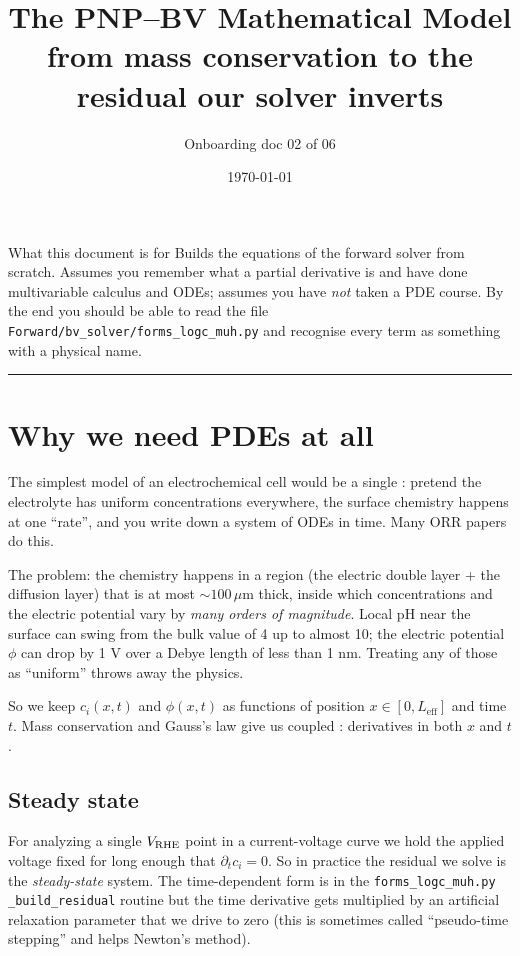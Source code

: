 \documentclass[11pt]{article}
\title{\bfseries The PNP--BV Mathematical Model \\
       \large from mass conservation to the residual our solver inverts}
\author{Onboarding doc 02 of 06}
\date{\today}
\begin{document}
\maketitle

\begin{callout}{What this document is for}
Builds the equations of the forward solver from scratch.
Assumes you remember what a partial derivative is and have done
multivariable calculus and ODEs; assumes you have \emph{not} taken a
PDE course. By the end you should be able to read the file
\texttt{Forward/bv\_solver/forms\_logc\_muh.py} and recognise every
term as something with a physical name.
\end{callout}

\tableofcontents
\bigskip\hrule\bigskip

\section{Why we need PDEs at all}

The simplest model of an electrochemical cell would be a single
: pretend the electrolyte has uniform
concentrations everywhere, the surface chemistry happens at one
``rate'', and you write down a system of ODEs in time. Many ORR
papers do this.

The problem: the chemistry happens in a region (the electric double
layer + the diffusion layer) that is at most $\sim 100\,\mu$m thick,
inside which concentrations and the electric potential vary by
\emph{many orders of magnitude}. Local pH near the surface can swing
from the bulk value of 4 up to almost 10; the electric potential
$\phi$ can drop by 1 V over a Debye length of less than 1 nm.
Treating any of those as ``uniform'' throws away the physics.

So we keep $c_i(x,t)$ and $\phi(x,t)$ as functions of position
$x \in [0, L_{\mathrm{eff}}]$ and time $t$. Mass conservation and
Gauss's law give us coupled : derivatives in both $x$ and $t$.

\subsection{Steady state}

For analyzing a single $V_{\mathrm{RHE}}$ point in a current-voltage curve we
hold the applied voltage fixed for long enough that
$\partial_t c_i = 0$. So in practice the residual we solve is the
\emph{steady-state} system. The time-dependent form is in the
\texttt{forms\_logc\_muh.py} \texttt{\_build\_residual} routine but
the time derivative gets multiplied by an artificial relaxation
parameter that we drive to zero (this is sometimes called
``pseudo-time stepping'' and helps Newton's method).
\end{document}
